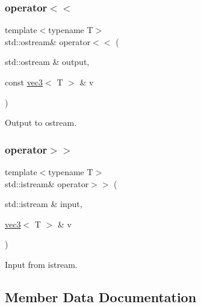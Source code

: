 \mbox{\label{structvec3_af5e1bcad9d3d484d6f4e6b3f8949f5cf}} 
\subsubsection{\texorpdfstring{operator$<$$<$}{operator<<}}
{\footnotesize\ttfamily template$<$typename T$>$ \\
std\+::ostream\& operator$<$$<$ (\begin{DoxyParamCaption}\item[{std\+::ostream \&}]{output,  }\item[{const \mbox{\hyperlink{structvec3}{vec3}}$<$ T $>$ \&}]{v }\end{DoxyParamCaption})\hspace{0.3cm}{\ttfamily [friend]}}



Output to ostream. 

\mbox{\label{structvec3_a72f92578884bd68e0747871acd8545fd}} 
\subsubsection{\texorpdfstring{operator$>$$>$}{operator>>}}
{\footnotesize\ttfamily template$<$typename T$>$ \\
std\+::istream\& operator$>$$>$ (\begin{DoxyParamCaption}\item[{std\+::istream \&}]{input,  }\item[{\mbox{\hyperlink{structvec3}{vec3}}$<$ T $>$ \&}]{v }\end{DoxyParamCaption})\hspace{0.3cm}{\ttfamily [friend]}}



Input from istream. 



\subsection{Member Data Documentation}
\mbox{\label{structvec3_a3f1f0c60e13b8bf67f64b1afc9cd6d1a}} 
